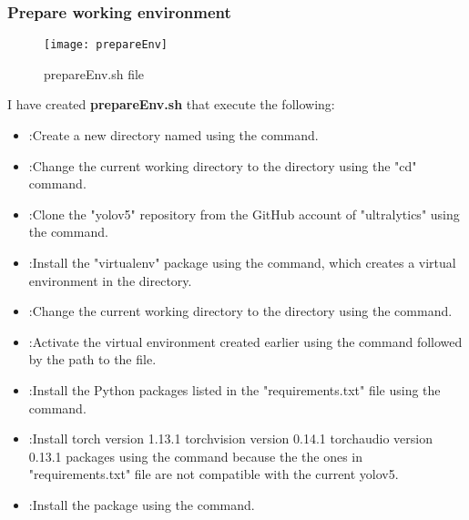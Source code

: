 \subsubsection{Prepare working environment}
\FloatBarrier
\begin{figure}[h]

       \centering

        \texttt{[image: prepareEnv]}
   
        \caption{prepareEnv.sh file}
        \label{fig:prepareEnv.sh file}

    \end{figure}
\FloatBarrier
I have created \textbf{prepareEnv.sh} that execute the following:
\begin{itemize}
    \item  {}:Create a new directory named   using the   command.
    \item  {}:Change the current working directory to the  directory using the "cd" command.
    \item  {}:Clone the "yolov5" repository from the GitHub account of "ultralytics" using the   command.
    \item  {}:Install the "virtualenv" package using the  command, which creates a virtual environment in the  directory.
    \item  {}:Change the current working directory to the directory using the  command.
    \item  {}:Activate the virtual environment created earlier using the  command followed by the path to the  file.
    \item  {}:Install the Python packages listed in the "requirements.txt" file using the  command.
    \item  {}:Install  torch version 1.13.1 torchvision version 0.14.1 torchaudio version 0.13.1 packages using the  command because the the ones in "requirements.txt" file are not compatible with the current yolov5.
    \item  {}:Install the  package using the  command.

\end{itemize}
